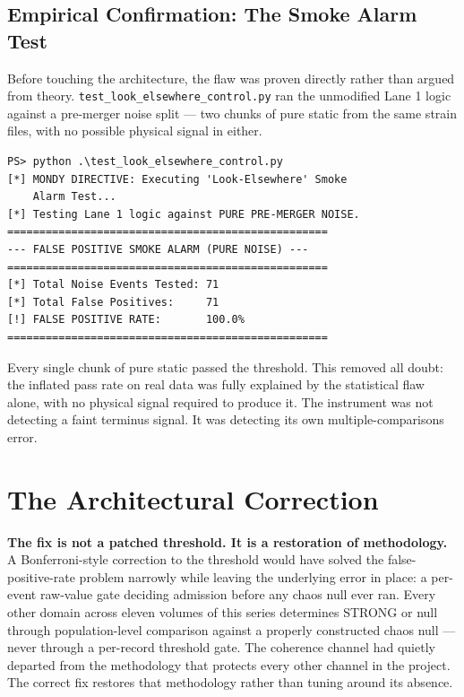 \documentclass[11pt, letterpaper, openany]{book}
\begin{document}
\subsection*{Empirical Confirmation: The Smoke Alarm Test}

Before touching the architecture, the flaw was proven directly rather
than argued from theory. \texttt{test\_look\_elsewhere\_control.py} ran
the unmodified Lane 1 logic against a pre-merger noise split --- two
chunks of pure static from the same strain files, with no possible
physical signal in either.

\begin{lstlisting}[style=terminal]
PS> python .\test_look_elsewhere_control.py
[*] MONDY DIRECTIVE: Executing 'Look-Elsewhere' Smoke
    Alarm Test...
[*] Testing Lane 1 logic against PURE PRE-MERGER NOISE.
==================================================
--- FALSE POSITIVE SMOKE ALARM (PURE NOISE) ---
==================================================
[*] Total Noise Events Tested: 71
[*] Total False Positives:     71
[!] FALSE POSITIVE RATE:       100.0%
==================================================
\end{lstlisting}

Every single chunk of pure static passed the threshold. This removed all
doubt: the inflated pass rate on real data was fully explained by the
statistical flaw alone, with no physical signal required to produce it.
The instrument was not detecting a faint terminus signal. It was
detecting its own multiple-comparisons error.

\clearpage
\section{The Architectural Correction}

\begin{discoverybox}
\textbf{The fix is not a patched threshold. It is a restoration of
methodology.} A Bonferroni-style correction to the threshold would have
solved the false-positive-rate problem narrowly while leaving the
underlying error in place: a per-event raw-value gate deciding admission
before any chaos null ever ran. Every other domain across eleven volumes
of this series determines STRONG or null through population-level
comparison against a properly constructed chaos null --- never through a
per-record threshold gate. The coherence channel had quietly departed
from the methodology that protects every other channel in the project.
The correct fix restores that methodology rather than tuning around its
absence.
\end{discoverybox}
\end{document}
